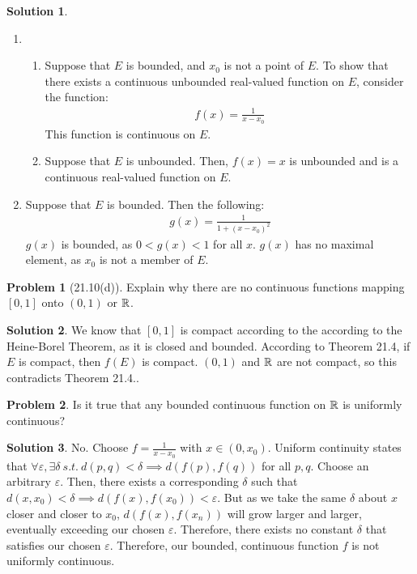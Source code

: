\documentclass[12pt]{article}
\theoremstyle{definition} %
\newtheorem{solution}{Solution}
\newtheorem{problem}{Problem}
\theoremstyle{plain} %
\begin{document}
\begin{solution}
 \begin{enumerate}
  \item \begin{enumerate}
    \item Suppose that \(E\) is bounded, and \(x_0\) is not a point of \(E\). To show that there exists a continuous unbounded real-valued function on \(E\), consider the function:
    \begin{align}
     f(x)=\frac{1}{x-x_0}
    \end{align} 
    This function is continuous on \(E\).
    \item Suppose that \(E\) is unbounded. Then, \(f(x)=x\) is unbounded and is a continuous real-valued function on \(E\). 
  \end{enumerate}
  \item Suppose that \(E\) is bounded. Then the following:
  \begin{align}
    g(x)=\frac{1}{1+(x-x_0)^{2}}
  \end{align}
\(g(x)\) is bounded, as \(0<g(x)<1\) for all \(x\). \(g(x)\) has no maximal element, as \(x_0\) is not a member of \(E\). 
 \end{enumerate} 
\end{solution}
\begin{problem}[21.10(d)]
    Explain why there are no continuous functions mapping \([0,1]\) onto \((0,1)\) or \(\mathbb{\MakeUppercase{r}}\).
\end{problem}
\begin{solution}
  We know that \([0,1]\) is compact according to the according to the Heine-Borel Theorem, as it is closed and bounded. According to Theorem 21.4, if \(E\) is compact, then \(f(E)\) is compact. \((0,1)\) and \(\mathbb{\MakeUppercase{r}}\) are not compact, so this contradicts Theorem 21.4..
\end{solution}
\begin{problem}
  Is it true that any bounded continuous function on \(\mathbb{\MakeUppercase{r}}\) is uniformly continuous? 
\end{problem}
\begin{solution}
  No. Choose \(f=\frac{1}{x-x_0}\) with \(x\in (0,x_0)\). Uniform continuity states that \(\forall \varepsilon, \exists \delta \ s.t. \ d(p,q)<\delta \implies d(f(p),f(q))\) for all \(p, q\). Choose an arbitrary \(\varepsilon\). Then, there exists a corresponding \(\delta\) such that \(d(x,x_0)<\delta\implies d(f(x),f(x_0))<\varepsilon\). But as we take the same \(\delta\) about \(x\) closer and closer to \(x_0\), \(d(f(x),f(x_n))\) will grow larger and larger, eventually exceeding our chosen \(\varepsilon\). Therefore, there exists no constant \(\delta\) that satisfies our chosen \(\varepsilon\). Therefore, our bounded, continuous function \(f\) is not uniformly continuous.    
\end{solution}
\end{document}
